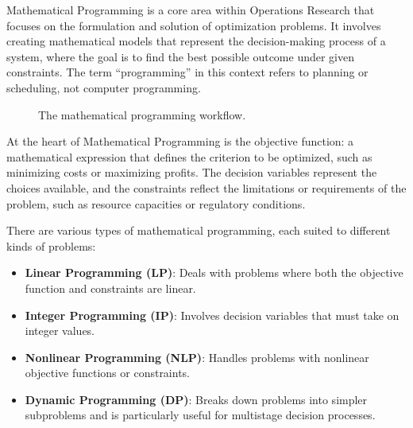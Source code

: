 Mathematical Programming is a core area within Operations Research that focuses on the formulation and solution of optimization problems. It involves creating mathematical models that represent the decision-making process of a system, where the goal is to find the best possible outcome under given constraints. The term ``programming'' in this context refers to planning or scheduling, not computer programming.

\begin{figure}
\centering
{}
\caption{The mathematical programming workflow.}
\label{fig:mp-pipeline}
\end{figure}
At the heart of Mathematical Programming is the objective function: a mathematical expression that defines the criterion to be optimized, such as minimizing costs or maximizing profits. The decision variables represent the choices available, and the constraints reflect the limitations or requirements of the problem, such as resource capacities or regulatory conditions.

There are various types of mathematical programming, each suited to different kinds of problems:

\begin{itemize}
    \item \textbf{Linear Programming (LP)}: Deals with problems where both the objective function and constraints are linear.
    \item \textbf{Integer Programming (IP)}: Involves decision variables that must take on integer values.
    \item \textbf{Nonlinear Programming (NLP)}: Handles problems with nonlinear objective functions or constraints.
    \item \textbf{Dynamic Programming (DP)}: Breaks down problems into simpler subproblems and is particularly useful for multistage decision processes.
\end{itemize}

